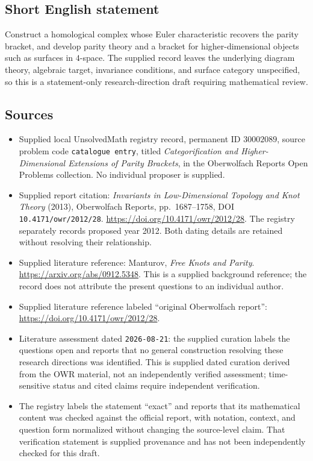 \documentclass[11pt]{article}
\begin{document}
\subsection{Short English statement}
Construct a homological complex whose Euler characteristic recovers the parity bracket, and develop parity theory and a bracket for higher-dimensional objects such as surfaces in \(4\)-space. The supplied record leaves the underlying diagram theory, algebraic target, invariance conditions, and surface category unspecified, so this is a statement-only research-direction draft requiring mathematical review.
\subsection{Sources}
\begin{itemize}
\item Supplied local UnsolvedMath registry record, permanent ID \(30002089\), source problem code \texttt{catalogue entry}, titled \emph{Categorification and Higher-Dimensional Extensions of Parity Brackets}, in the Oberwolfach Reports Open Problems collection. No individual proposer is supplied.
\item Supplied report citation: \emph{Invariants in Low-Dimensional Topology and Knot Theory} (2013), Oberwolfach Reports, pp.~1687--1758, DOI \texttt{10.4171/owr/2012/28}. \url{https://doi.org/10.4171/owr/2012/28}. The registry separately records proposed year 2012. Both dating details are retained without resolving their relationship.
\item Supplied literature reference: Manturov, \emph{Free Knots and Parity}. \url{https://arxiv.org/abs/0912.5348}. This is a supplied background reference; the record does not attribute the present questions to an individual author.
\item Supplied literature reference labeled ``original Oberwolfach report'': \url{https://doi.org/10.4171/owr/2012/28}.
\item Literature assessment dated \texttt{2026-08-21}: the supplied curation labels the questions open and reports that no general construction resolving these research directions was identified. This is supplied dated curation derived from the OWR material, not an independently verified assessment; time-sensitive status and cited claims require independent verification.
\item The registry labels the statement ``exact'' and reports that its mathematical content was checked against the official report, with notation, context, and question form normalized without changing the source-level claim. That verification statement is supplied provenance and has not been independently checked for this draft.
\end{itemize}
\end{document}
